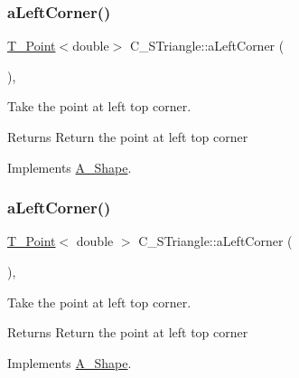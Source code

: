 \subsubsection{\texorpdfstring{a\+Left\+Corner()}{aLeftCorner()}\hspace{0.1cm}{\footnotesize\ttfamily [1/2]}}
{\footnotesize\ttfamily \hyperlink{classT__Point}{T\+\_\+\+Point}$<$double$>$ C\+\_\+\+S\+Triangle\+::a\+Left\+Corner (\begin{DoxyParamCaption}{ }\end{DoxyParamCaption})\hspace{0.3cm}{\ttfamily [override]}, {\ttfamily [virtual]}}



Take the point at left top corner. 

\begin{DoxyReturn}{Returns}
Return the point at left top corner 
\end{DoxyReturn}


Implements \hyperlink{classA__Shape_abe6781b13037bf7ecea8ff9456b31533}{A\+\_\+\+Shape}.

\mbox{\label{classC__STriangle_a8e580f80693ea6f66cca3782ced8e301}} 
\subsubsection{\texorpdfstring{a\+Left\+Corner()}{aLeftCorner()}\hspace{0.1cm}{\footnotesize\ttfamily [2/2]}}
{\footnotesize\ttfamily \hyperlink{classT__Point}{T\+\_\+\+Point}$<$ double $>$ C\+\_\+\+S\+Triangle\+::a\+Left\+Corner (\begin{DoxyParamCaption}{ }\end{DoxyParamCaption})\hspace{0.3cm}{\ttfamily [override]}, {\ttfamily [virtual]}}



Take the point at left top corner. 

\begin{DoxyReturn}{Returns}
Return the point at left top corner 
\end{DoxyReturn}


Implements \hyperlink{classA__Shape_abe6781b13037bf7ecea8ff9456b31533}{A\+\_\+\+Shape}.

